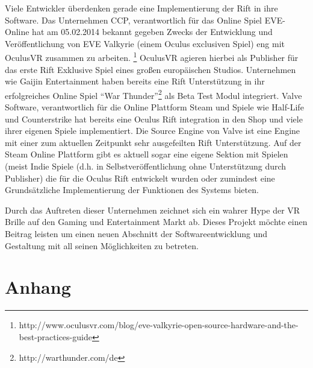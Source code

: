 \documentclass[pagesize, paper=a4, fontsize=12pt,titlepage=true, headings=small, headnosepline, abstractoff, liststotoc, nochapterprefix, plainheadsepline]{scrreprt}
\begin{document}
Viele Entwickler überdenken gerade eine Implementierung der Rift in ihre Software. Das Unternehmen CCP, verantwortlich für das Online Spiel EVE-Online hat am 05.02.2014 bekannt gegeben Zwecks der Entwicklung und Veröffentlichung von EVE Valkyrie (einem Oculus exclusiven Spiel) eng mit OculusVR zusammen zu arbeiten. \footnote{http://www.oculusvr.com/blog/eve-valkyrie-open-source-hardware-and-the-best-practices-guide} OculusVR agieren hierbei als Publisher für das erste Rift Exklusive Spiel eines großen europäischen Studios. Unternehmen wie Gaijin Entertainment haben bereits eine Rift Unterstützung in ihr erfolgreiches Online Spiel "`War Thunder"'\footnote{http://warthunder.com/de} als Beta Test Modul integriert. Valve Software, verantwortlich für die Online Plattform Steam und Spiele wie Half-Life und Counterstrike hat bereits eine Oculus Rift integration in den Shop und viele ihrer eigenen Spiele implementiert. Die Source Engine von Valve ist eine Engine mit einer zum aktuellen Zeitpunkt sehr ausgefeilten Rift Unterstützung. Auf der Steam Online Plattform gibt es aktuell sogar eine eigene Sektion mit Spielen (meist Indie Spiele (d.h. in Selbstveröffentlichung ohne Unterstützung durch Publisher) die für die Oculus Rift entwickelt wurden oder zumindest eine Grundsätzliche Implementierung der Funktionen des Systems bieten.

Durch das Auftreten dieser Unternehmen zeichnet sich ein wahrer Hype der VR Brille auf den Gaming und Entertainment Markt ab. Dieses Projekt möchte einen Beitrag leisten um einen neuen Abschnitt der Softwareentwicklung und Gestaltung mit all seinen Möglichkeiten zu betreten.


\part*{Anhang}



\end{document}
